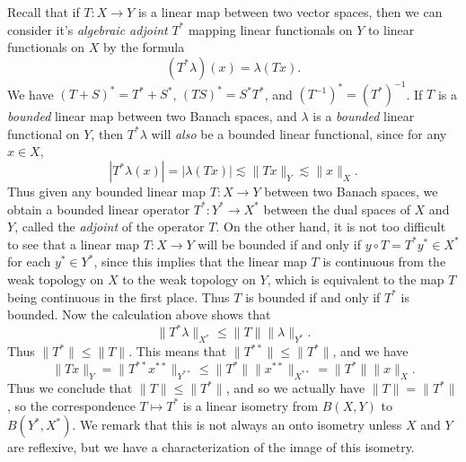 Recall that if $T: X \to Y$ is a linear map between two vector spaces, then we can consider it's \emph{algebraic adjoint} $T^*$ mapping linear functionals on $Y$ to linear functionals on $X$ by the formula
%
\[ (T^* \lambda)(x) = \lambda(Tx). \]
%
We have $(T+S)^* = T^* + S^*$, $(TS)^* = S^* T^*$, and $(T^{-1})^* = (T^*)^{-1}$. If $T$ is a \emph{bounded} linear map between two Banach spaces, and $\lambda$ is a \emph{bounded} linear functional on $Y$, then $T^* \lambda$ will \emph{also} be a bounded linear functional, since for any $x \in X$,
%
\[ |T^* \lambda(x)| = |\lambda (Tx) | \lesssim \| Tx \|_Y \lesssim \| x \|_X. \]
%
Thus given any bounded linear map $T: X \to Y$ between two Banach spaces, we obtain a bounded linear operator $T^*: Y^* \to X^*$ between the dual spaces of $X$ and $Y$, called the \emph{adjoint} of the operator $T$. On the other hand, it is not too difficult to see that a linear map $T: X \to Y$ will be bounded if and only if $y \circ T = T^* y^* \in X^*$ for each $y^* \in Y^*$, since this implies that the linear map $T$ is continuous from the weak topology on $X$ to the weak topology on $Y$, which is equivalent to the map $T$ being continuous in the first place. Thus $T$ is bounded if and only if $T^*$ is bounded. Now the calculation above shows that
%
\[ \| T^* \lambda \|_{X^*} \leq \| T \| \| \lambda \|_{Y^*}. \]
%
Thus $\| T^* \| \leq \| T \|$. This means that $\| T^{**} \| \leq \| T^* \|$, and we have
%
\[ \| Tx \|_Y = \| T^{**} x^{**} \|_{Y^{**}} \leq \| T^* \| \| x^{**} \|_{X^{**}} = \| T^* \| \| x \|_X. \]
%
Thus we conclude that $\| T \| \leq \| T^* \|$, and so we actually have $\| T \| = \| T^* \|$, so the correspondence $T \mapsto T^*$ is a linear isometry from $B(X,Y)$ to $B(Y^*,X^*)$. We remark that this is not always an onto isometry unless $X$ and $Y$ are reflexive, but we have a characterization of the image of this isometry.

